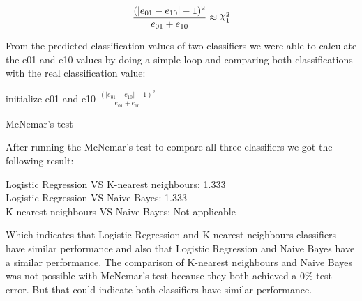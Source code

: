 \documentclass[a4paper]{article}
\DeclareRobustCommand{\rchi}{{\mathpalette\irchi\relax}}
\newcommand{\irchi}[2]{\raisebox{\depth}{$#1\chi$}}
\begin{document}
\begin{equation}
\frac{(|e_{01} - e_{10}| - 1)^2}{e_{01}+e_{10}}\approx\rchi^2_{1}
\end{equation}

From the predicted classification values of two classifiers we were able to calculate the e01 and e10 values by 
doing a simple loop and comparing both classifications with the real classification value:\\

\begin{algorithm}[H]
	initialize e01 and e10\;
	\Return $\frac{(|e_{01} - e_{10}| - 1)^2}{e_{01}+e_{10}}$
	\caption{McNemar's test}
\end{algorithm}
\bigbreak

After running the McNemar's test to compare all three classifiers we got the following result:\\
\begin{center}
Logistic Regression VS K-nearest neighbours: 1.333\\
Logistic Regression VS Naive Bayes: 1.333\\
K-nearest neighbours VS Naive Bayes: Not applicable
\end{center}

Which indicates that Logistic Regression and K-nearest neighbours classifiers have similar performance and
also that Logistic Regression and Naive Bayes have a similar performance.
The comparison of K-nearest neighbours and Naive Bayes was not possible with McNemar's test because
they both achieved a 0\% test error. But that could indicate both classifiers have similar performance.

\end{document}

